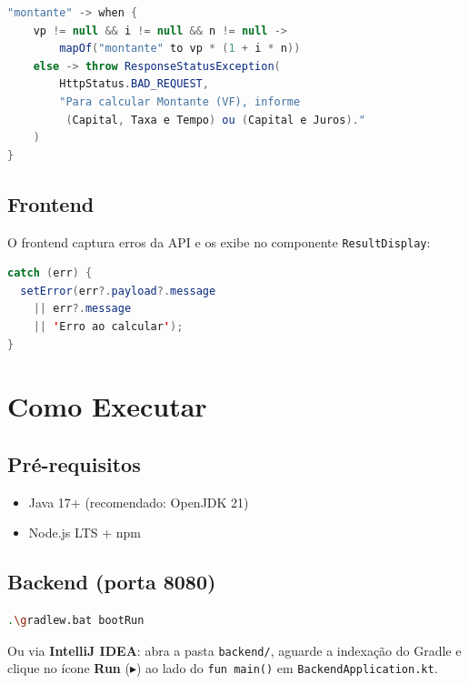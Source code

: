 \documentclass[12pt,a4paper]{article}
\begin{document}
\begin{lstlisting}[language=java,title={Exemplo de validação (SimplesService.kt)}]
"montante" -> when {
    vp != null && i != null && n != null ->
        mapOf("montante" to vp * (1 + i * n))
    else -> throw ResponseStatusException(
        HttpStatus.BAD_REQUEST,
        "Para calcular Montante (VF), informe
         (Capital, Taxa e Tempo) ou (Capital e Juros)."
    )
}
\end{lstlisting}

\subsection{Frontend}

O frontend captura erros da API e os exibe no componente \texttt{ResultDisplay}:

\begin{lstlisting}[language=java,title={Captura de erro no componente}]
catch (err) {
  setError(err?.payload?.message
    || err?.message
    || 'Erro ao calcular');
}
\end{lstlisting}

\section{Como Executar}

\subsection{Pré-requisitos}

\begin{itemize}
  \item Java 17+ (recomendado: OpenJDK 21)
  \item Node.js LTS + npm
\end{itemize}

\subsection{Backend (porta 8080)}

\begin{lstlisting}[language=bash,title={Terminal na pasta backend/}]
.\gradlew.bat bootRun
\end{lstlisting}

Ou via \textbf{IntelliJ IDEA}: abra a pasta \texttt{backend/}, aguarde a indexação do Gradle e clique no ícone \textbf{Run} ($\blacktriangleright$) ao lado do \texttt{fun main()} em \texttt{BackendApplication.kt}.
\end{document}
